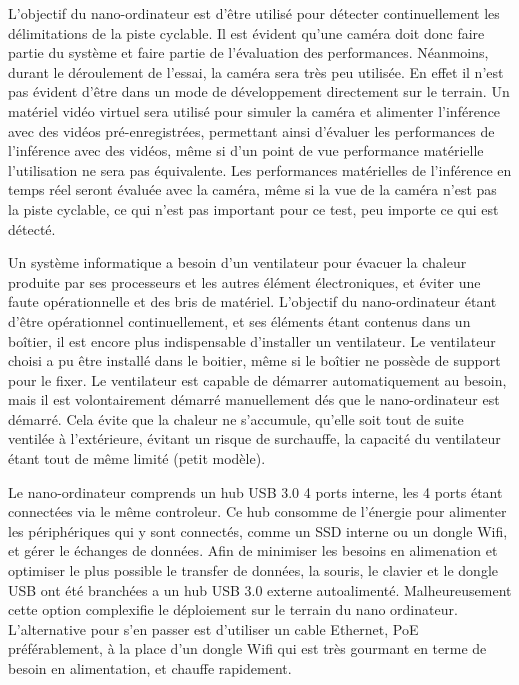 \par L'objectif du nano-ordinateur est d'être utilisé pour détecter continuellement les délimitations de la piste cyclable. Il est évident qu'une caméra doit donc faire partie du système et faire partie de l'évaluation des performances. Néanmoins, durant le déroulement de l'essai, la caméra sera très peu utilisée. En effet il n'est pas évident d'être dans un mode de développement directement sur le terrain. Un matériel vidéo virtuel sera utilisé pour simuler la caméra et alimenter l'inférence avec des vidéos pré-enregistrées, permettant ainsi d'évaluer les performances de l'inférence avec des vidéos, même si d'un point de vue performance matérielle l'utilisation ne sera pas équivalente. Les performances matérielles de l'inférence en temps réel seront évaluée avec la caméra, même si la vue de la caméra n'est pas la piste cyclable, ce qui n'est pas important pour ce test, peu importe ce qui est détecté.
\par [TODO ajout photo] 
\par Un système informatique a besoin d'un ventilateur pour évacuer la chaleur produite par ses processeurs et les autres élément électroniques, et éviter une faute opérationnelle et des bris de matériel. L'objectif du nano-ordinateur étant d'être opérationnel continuellement, et ses éléments étant contenus dans un boîtier, il est encore plus indispensable d'installer un ventilateur. Le ventilateur choisi a pu être installé dans le boitier, même si le boîtier ne possède de support pour le fixer. Le ventilateur est capable de démarrer automatiquement au besoin, mais il est volontairement démarré manuellement dés que le nano-ordinateur est démarré. Cela évite que la chaleur ne s'accumule, qu'elle soit tout de suite ventilée à l'extérieure, évitant un risque de surchauffe, la capacité du ventilateur étant tout de même limité (petit modèle).
\par [TODO ajout photo] 
\par [photo] Le nano-ordinateur comprends un hub USB 3.0 4 ports interne, les 4 ports étant connectées via le même controleur. Ce hub consomme de l'énergie pour alimenter les périphériques qui y sont connectés, comme un SSD interne ou un dongle Wifi, et gérer le échanges de données. Afin de minimiser les besoins en alimenation et optimiser le plus possible le transfer de données, la souris, le clavier et le dongle USB ont été branchées a un hub USB 3.0 externe autoalimenté. Malheureusement cette option complexifie le déploiement sur le terrain du nano ordinateur. L'alternative pour s'en passer est d'utiliser un cable Ethernet, PoE préférablement, à la place d'un dongle Wifi qui est très gourmant en terme de besoin en alimentation, et chauffe rapidement.
